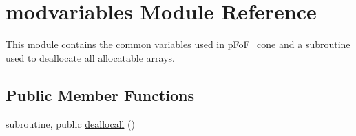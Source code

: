 \hypertarget{classmodvariables}{\section{modvariables Module Reference}
\label{classmodvariables}
}


This module contains the common variables used in p\-Fo\-F\-\_\-cone and a subroutine used to deallocate all allocatable arrays.  


\subsection*{Public Member Functions}
\begin{DoxyCompactItemize}
\item 
subroutine, public \hyperlink{classmodvariables_a3129973de5d2d861f0c48902ad5a9dd1}{deallocall} ()
\end{DoxyCompactItemize}
